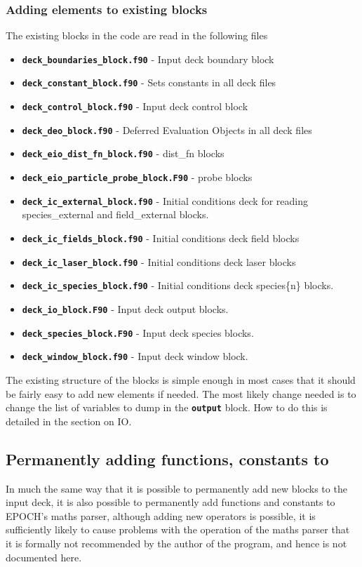 \documentclass[12pt,a4paper]{article}
\newcommand{\inlinecode}[1]{{\color{warwickred} \bf\texttt{#1}}}
\newcommand{\EPOCH}{{\color{warwickdark}\fontfamily{phv}\selectfont{EPOCH}}}
\begin{document}
\subsubsection{Adding elements to existing blocks}
The existing blocks in the code are read in the following files
\begin{itemize}
\item \inlinecode{deck\_boundaries\_block.f90} - Input deck boundary block
\item \inlinecode{deck\_constant\_block.f90} - Sets constants in all deck files
\item \inlinecode{deck\_control\_block.f90} - Input deck control block
\item \inlinecode{deck\_deo\_block.f90} - Deferred Evaluation Objects in all
  deck files
\item \inlinecode{deck\_eio\_dist\_fn\_block.f90} - dist\_fn blocks
\item \inlinecode{deck\_eio\_particle\_probe\_block.F90} - probe blocks
\item \inlinecode{deck\_ic\_external\_block.f90} - Initial conditions deck for
  reading species\_external and field\_external blocks.
\item \inlinecode{deck\_ic\_fields\_block.f90} - Initial conditions deck field
  blocks
\item \inlinecode{deck\_ic\_laser\_block.f90} - Initial conditions deck laser
  blocks
\item \inlinecode{deck\_ic\_species\_block.f90} - Initial conditions deck
  species\{n\} blocks.
\item \inlinecode{deck\_io\_block.F90} - Input deck output blocks.
\item \inlinecode{deck\_species\_block.F90} - Input deck species blocks.
\item \inlinecode{deck\_window\_block.f90} - Input deck window block.
\end{itemize}

The existing structure of the blocks is simple enough in most cases that it
should be fairly easy to add new elements if needed. The most likely change
needed is to change the list of variables to dump in the \inlinecode{output}
block. How to do this is detailed in the section on {\EPOCH} IO.

\subsection{Permanently adding functions, constants to {\EPOCH}}
In much the same way that it is possible to permanently add new blocks to the
input deck, it is also possible to permanently add functions and constants to
EPOCH's maths parser, although adding new operators is possible, it is
sufficiently likely to cause problems with the operation of the maths parser
that it is formally not recommended by the author of the program, and hence is
not documented here.
\end{document}
